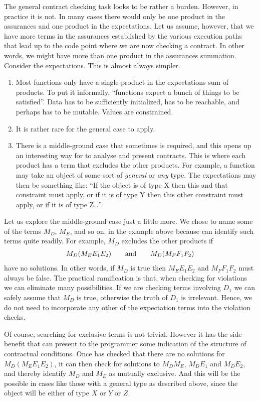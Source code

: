 \documentclass[10pt]{amsart}
\begin{document}
The general contract checking task looks to be rather a burden.
However, in practice it is not.  In many cases there would only be one
product in the assurances and one product in the expectations.  Let us
assume, however, that we have more terms in the assurances established
by the various execution paths that lead up to the code point where we
are now checking a contract.  In other words, we might have more than
one product in the assurances summation.  Consider the expectations.
This is almost always simpler.
\begin{enumerate}
\item Most functions only have a single product in the expectations
  sum of products.  To put it informally, ``functions expect a bunch
  of things to be satisfied''.  Data has to be sufficiently
  initialized, has to be reachable, and perhaps has to be mutable.
  Values are constrained.
\item It is rather rare for the general case to apply.
\item There is a middle-ground case that sometimes is required, and
  this opens up an interesting way for \Utop to analyse and present
  contracts.  This is where each product has a term that excludes the
  other products.  For example, a function may take an object of some
  sort of \emph{general} or \emph{any} type.  The expectations may
  then be something like: ``If the object is of type X then this and
  that constraint must apply, or if it is of type Y then this other
  constraint must apply, or if it is of type Z\ldots''.
\end{enumerate}

Let us explore the middle-ground case just a little more.  We chose to
name some of the terms $M_D$, $M_E$, and so on, in the example above
because \Utop can identify such terms quite readily.  For example,
$M_D$ excludes the other products if
\begin{gather}
  \notag
  M_D(M_EE_1E_2) \qquad\text{and}\qquad
  M_D(M_FF_1F_2)
\end{gather}
have no solutions.  In other words, if $M_D$ is true then $M_EE_1E_2$
and $M_FF_1F_2$ must always be false.  The practical ramification is
that, when checking for violations we can eliminate many
possibilities.  If we are checking terms involving $D_1$ we can safely
assume that $M_D$ is true, otherwise the truth of $D_1$ is irrelevant.
Hence, we do not need to incorporate any other of the expectation
terms into the violation checks.

Of course, searching for exclusive terms is not trivial.  However it
has the side benefit that \Utop can present to the programmer some
indication of the structure of contractual conditions.  Once \Utop has
checked that there are no solutions for $M_D(M_EE_1E_2)$, it can then
check for solutions to $M_DM_E$, $M_DE_1$ and $M_DE_2$, and thereby
identify $M_D$ and $M_E$ as mutually exclusive.  And this will be the
possible in cases like those with a general type as described above,
since the object will be either of type $X$ or $Y$ or $Z$.
\end{document}
